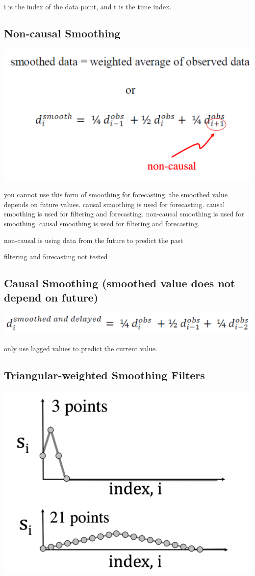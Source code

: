 \documentclass[11pt]{article}
\theoremstyle{definition}
\begin{document}
i is the index of the data point, and t is the time index.

\subsection{Non-causal Smoothing}
\includegraphics[width = \textwidth/2]{15.png}

you cannot use this form of smoothing for forecasting. the smoothed value depends on future values. causal smoothing is used for forecasting. causal smoothing is used for filtering and forecasting. non-causal smoothing is used for smoothing. causal smoothing is used for filtering and forecasting. 

non-causal is using data from the future to predict the past

filtering and forecasting not tested

\subsection{Causal Smoothing
(smoothed value does not depend on future)}
\includegraphics[width = \textwidth/2]{16.png}

only use lagged values to predict the current value.

\subsection{Triangular-weighted Smoothing Filters}
\includegraphics[width = \textwidth/2]{17.png}
\end{document}
